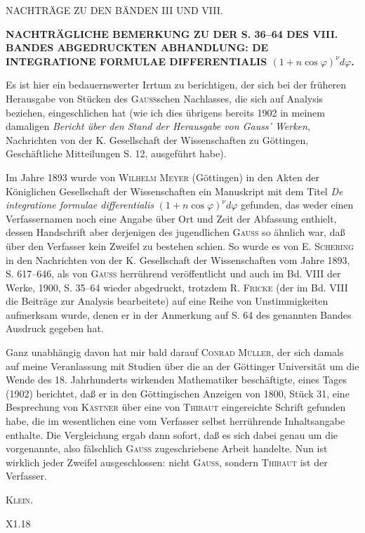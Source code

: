 \clearpage
{}\NoSourceHead
{}
\vspace*{2in}
\begin{center}NACHTRÄGE ZU DEN BÄNDEN III UND VIII.\end{center}
\clearpage
{}
\begin{center}\bfseries
NACHTRÄGLICHE BEMERKUNG ZU DER S. 36--64 DES VIII. BANDES ABGEDRUCKTEN
ABHANDLUNG: DE INTEGRATIONE FORMULAE DIFFERENTIALIS $(1+n\cos\varphi)^\nu d\varphi$.
\end{center}
\noindent\hspace*{\parindent}Es ist hier ein bedauernswerter Irrtum zu berichtigen, der sich bei der früheren Herausgabe von
Stücken des \textsc{Gauss}schen Nachlasses, die sich auf Analysis beziehen, eingeschlichen hat (wie ich dies
übrigens bereits 1902 in meinem damaligen \textit{Bericht über den Stand der Herausgabe von Gauss’ Werken},
Nachrichten von der K. Gesellschaft der Wissenschaften zu Göttingen, Geschäftliche Mitteilungen S. 12,
ausgeführt habe).

Im Jahre 1893 wurde von \textsc{Wilhelm Meyer} (Göttingen) in den Akten der Königlichen Gesellschaft
der Wissenschaften ein Manuskript mit dem Titel \textit{De integratione formulae differentialis} $(1+n\cos\varphi)^\nu d\varphi$
gefunden, das weder einen Verfassernamen noch eine Angabe über Ort und Zeit der Abfassung enthielt,
dessen Handschrift aber derjenigen des jugendlichen \textsc{Gauss} so ähnlich war, daß über den Verfasser kein
Zweifel zu bestehen schien. So wurde es von E. \textsc{Schering} in den Nachrichten von der K. Gesellschaft der
Wissenschaften vom Jahre 1893, S. 617--646, als von \textsc{Gauss} herrührend veröffentlicht und auch im Bd. VIII
der Werke, 1900, S. 35--64 wieder abgedruckt, trotzdem R. \textsc{Fricke} (der im Bd. VIII die Beiträge zur Analysis bearbeitete)
auf eine Reihe von Unstimmigkeiten aufmerksam wurde, denen er in der Anmerkung auf
S. 64 des genannten Bandes Ausdruck gegeben hat.

Ganz unabhängig davon hat mir bald darauf \textsc{Conrad Müller}, der sich damals auf meine Veranlassung
mit Studien über die an der Göttinger Universität um die Wende des 18. Jahrhunderts wirkenden
Mathematiker beschäftigte, eines Tages (1902) berichtet, daß er in den Göttingischen Anzeigen von 1800,
Stück 31, eine Besprechung von \textsc{Kästner} über eine von \textsc{Thibaut} eingereichte Schrift gefunden habe, die
im wesentlichen eine vom Verfasser selbst herrührende Inhaltsangabe enthalte. Die Vergleichung ergab
dann sofort, daß es sich dabei genau um die vorgenannte, also fälschlich \textsc{Gauss} zugeschriebene Arbeit
handelte. Nun ist wirklich jeder Zweifel ausgeschlossen: nicht \textsc{Gauss}, sondern \textsc{Thibaut} ist der Verfasser.
\par\noindent\hfill\textsc{Klein}.\par
\ClosingRule
\vfill\noindent\small X1.\hfill18\hspace*{.15\linewidth}\normalsize
\clearpage
